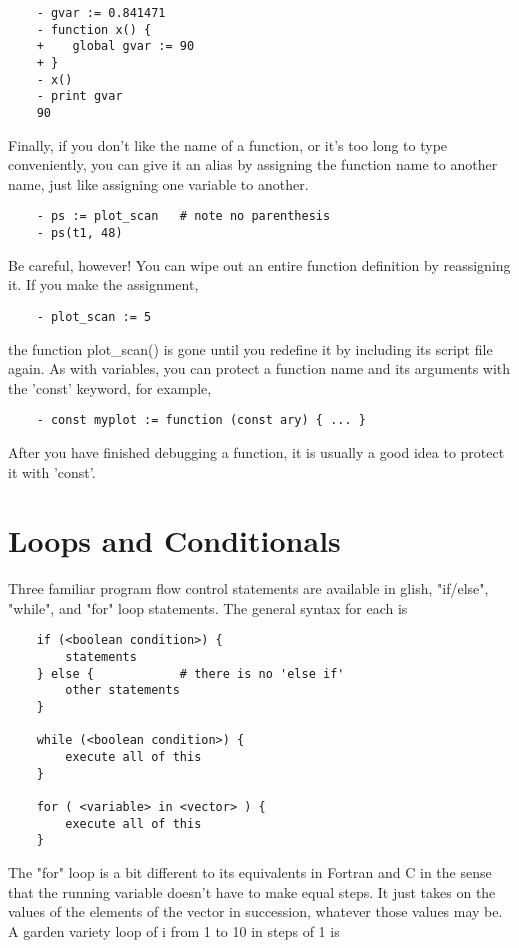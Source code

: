 \begin{verbatim}
	- gvar := 0.841471
	- function x() {
	+    global gvar := 90
	+ }
	- x()
	- print gvar
	90
\end{verbatim}

    Finally, if you don't like the name of a function, or it's too long to
type conveniently, you can give it an alias by assigning the function name
to another name, just like assigning one variable to another.

\begin{verbatim}
	- ps := plot_scan	# note no parenthesis
	- ps(t1, 48)
\end{verbatim}

Be careful, however!  You can wipe out an entire function definition by
reassigning it.  If you make the assignment,

\begin{verbatim}
	- plot_scan := 5
\end{verbatim}

the function plot\_scan() is gone until you redefine it by including its
script file again.  As with variables, you can protect a function name and
its arguments with the 'const' keyword, for example,

\begin{verbatim}
	- const myplot := function (const ary) { ... }
\end{verbatim}

After you have finished debugging a function, it is usually a good idea to
protect it with 'const'.

\section{Loops and Conditionals}

    Three familiar program flow control statements are available in glish,
"if/else", "while", and "for" loop statements.  The general syntax for each
is

\begin{verbatim}
	if (<boolean condition>) {
	    statements
	} else {			# there is no 'else if'
	    other statements
	}

	while (<boolean condition>) {
	    execute all of this
	}

	for ( <variable> in <vector> ) {
	    execute all of this
	}
\end{verbatim}

The "for" loop is a bit different to its equivalents in Fortran and C in
the sense that the running variable doesn't have to make equal steps.  It
just takes on the values of the elements of the vector in succession,
whatever those values may be.  A garden variety loop of i from 1 to 10 in
steps of 1 is

